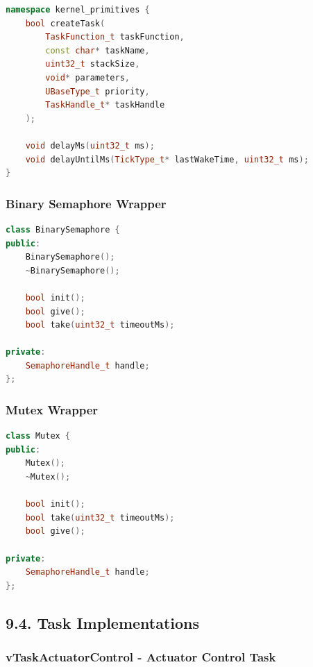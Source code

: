 \documentclass[12pt]{article}
\begin{document}
\begin{lstlisting}[language=C++, caption=Task Creation Wrapper (task.h/cpp)]
namespace kernel_primitives {
    bool createTask(
        TaskFunction_t taskFunction,
        const char* taskName,
        uint32_t stackSize,
        void* parameters,
        UBaseType_t priority,
        TaskHandle_t* taskHandle
    );
    
    void delayMs(uint32_t ms);
    void delayUntilMs(TickType_t* lastWakeTime, uint32_t ms);
}
\end{lstlisting}

\subsubsection*{Binary Semaphore Wrapper}

\begin{lstlisting}[language=C++, caption=Binary Semaphore Wrapper (binary_semaphore.h/cpp)]
class BinarySemaphore {
public:
    BinarySemaphore();
    ~BinarySemaphore();
    
    bool init();
    bool give();
    bool take(uint32_t timeoutMs);
    
private:
    SemaphoreHandle_t handle;
};
\end{lstlisting}

\subsubsection*{Mutex Wrapper}

\begin{lstlisting}[language=C++, caption=Mutex Wrapper (mutex.h/cpp)]
class Mutex {
public:
    Mutex();
    ~Mutex();
    
    bool init();
    bool take(uint32_t timeoutMs);
    bool give();
    
private:
    SemaphoreHandle_t handle;
};
\end{lstlisting}

\subsection*{9.4. Task Implementations}

\subsubsection*{vTaskActuatorControl - Actuator Control Task}
\end{document}
